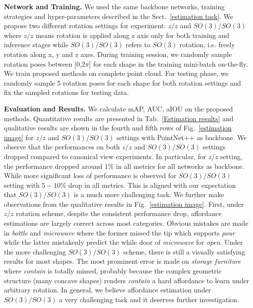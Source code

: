 \documentclass[final]{cvpr}
\begin{document}
\noindent\textbf{Network and Training.} We used the same backbone networks, training strategies and hyper-parameters described in the Sect.~\ref{estimation task}. We propose two different rotation settings for experiment: $z/z$ and $SO(3)/SO(3)$ where $z/z$ means rotation is applied along z axis only for both training and inference stages while $SO(3)/SO(3)$ refers to $SO(3)$ rotation, i.e. freely rotation along x, y and z axes. During training session, we randomly sample rotation poses between [0,2$\pi$] for each shape in the training mini-batch on-the-fly. We train proposed methods on complete point cloud. For testing phase, we randomly sample 5 rotation poses for each shape for both rotation settings and fix the sampled rotations for testing data.

\noindent\textbf{Evaluation and Results.} We calculate mAP, AUC, aIOU on the proposed methods. Quantitative results are presented in Tab.~\ref{Estimation results} and qualitative results are shown in the fourth and fifth rows of Fig.~\ref{estimation image} for $z/z$ and $SO(3)/SO(3)$ settings with PointNet++ as backbone. We observe that the performances on both $z/z$ and $SO(3)/SO(3)$ settings dropped compared to canonical view experiments. In particular, for $z/z$ setting, the performance dropped around $1\%$ in all metrics for all networks as backbone. While more significant loss of performance is observed for $SO(3)/SO(3)$ setting with $5-10\%$ drop in all metrics. This is aligned with our expectation that $SO(3)/SO(3)$ is a much more challenging task. We further make observations from the qualitative results in Fig.~\ref{estimation image}. First, under $z/z$ rotation scheme, despite the consistent performance drop, affordance estimations are largely correct across most categories. Obvious mistakes are made in \textit{bottle} and \textit{microwave} where the former missed the tip which supports \textit{pour} while the latter mistakenly predict the while door of \textit{microwave} for \textit{open}. Under the more challenging $SO(3)/SO(3)$ scheme, there is still a visually satisfying results for most shapes. The most prominent error is made on \textit{storage furniture} where \textit{contain} is totally missed, probably because the complex geometric structure (many concave shapes) renders \textit{contain} a hard affordance to learn under arbitrary rotation.
In general, we believe affordance estimation under $SO(3)/SO(3)$ a very challenging task and it deserves further investigation.
\end{document}
